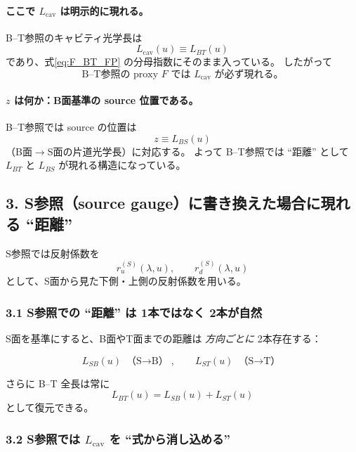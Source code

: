 \paragraph{ここで \(L_{\mathrm{cav}}\) は明示的に現れる。}
B--T参照のキャビティ光学長は
\begin{equation}
\boxed{
L_{\mathrm{cav}}(u)\equiv L_{BT}(u)
}
\end{equation}
であり、式\eqref{eq:F_BT_FP} の分母指数にそのまま入っている。
したがって
\[
\boxed{\text{B--T参照の proxy \(F\) では \(L_{\mathrm{cav}}\) が必ず現れる。}}
\]

\paragraph{\(z\) は何か：B面基準の source 位置である。}
B--T参照では source の位置は
\begin{equation}
\boxed{
z \equiv L_{BS}(u)
}
\end{equation}
（B面\(\rightarrow\)S面の片道光学長）に対応する。
よって B--T参照では ``距離'' として
\(\boxed{L_{BT}}\) と \(\boxed{L_{BS}}\) が現れる構造になっている。

\subsection*{3. S参照（source gauge）に書き換えた場合に現れる ``距離''}

S参照では反射係数を
\begin{equation}
r_u^{(S)}(\lambda,u),\qquad r_d^{(S)}(\lambda,u)
\end{equation}
として、S面から見た下側・上側の反射係数を用いる。

\subsubsection*{3.1 S参照での ``距離'' は 1本ではなく 2本が自然}

S面を基準にすると、B面やT面までの距離は
\emph{方向ごとに} 2本存在する：

\begin{equation}
\boxed{
L_{SB}(u)\ \text{（S\(\rightarrow\)B）},\qquad
L_{ST}(u)\ \text{（S\(\rightarrow\)T）}
}
\end{equation}

さらに B--T 全長は常に
\begin{equation}
\boxed{
L_{BT}(u)=L_{SB}(u)+L_{ST}(u)
}
\end{equation}
として復元できる。

\subsubsection*{3.2 S参照では \(L_{\mathrm{cav}}\) を ``式から消し込める''}

